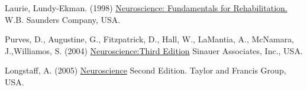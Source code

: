 Laurie, Lundy-Ekman. (1998) \underline{Neuroscience: Fundamentals for Rehabilitation.} W.B. Saunders Company, USA.

Purves, D., Augustine, G., Fitzpatrick, D., Hall, W., LaMantia, A., McNamara, J.,Williamos, S. (2004) \underline{Neuroscience:Third Edition} Sinauer Associates, Inc., USA.

Longstaff, A. (2005) \underline{Neuroscience} Second Edition. Taylor and Francis Group, USA.

